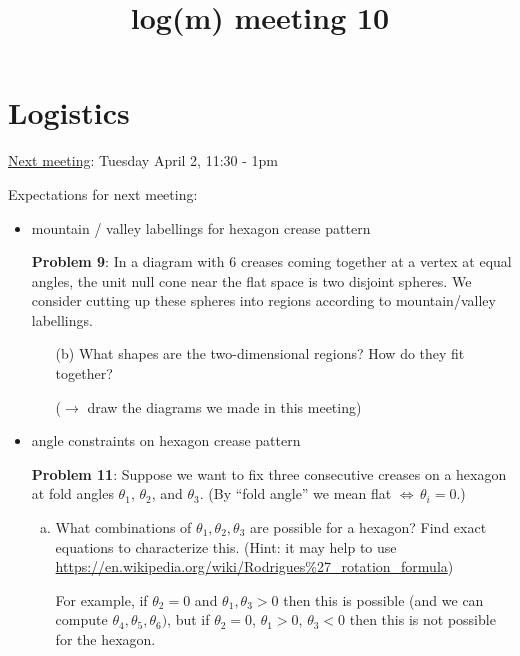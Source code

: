 \documentclass{article}
\title{log(m) meeting 10}
\theoremstyle{definition}
\begin{document}
\section{Logistics}

\ul{Next meeting}:  Tuesday April 2, 11:30 - 1pm
\medskip

    
\bigskip
{Expectations} for next meeting: 
\begin{itemize}

    
    
    \item mountain / valley labellings
    for hexagon crease pattern
    
    \textbf{Problem 9}: 
    In a diagram with $6$ creases coming together at a vertex at equal angles,
the unit null cone near the flat space is two disjoint spheres.
We consider cutting up  these spheres into regions according to mountain/valley labellings.
\begin{enumerate}[(a)]
    
    \item[(b)] What shapes are the two-dimensional regions? 
    How do they fit together? 
    
    ($\rightarrow$ draw the diagrams we made in this meeting)
\end{enumerate}
    
   
    \item angle constraints on hexagon crease pattern
    
    \textbf{Problem 11}:
    Suppose we want to fix three consecutive creases on a hexagon at fold angles
    $\theta_1$, $\theta_2$, and $\theta_3$. 
    (By ``fold angle'' we mean flat $\Leftrightarrow \, \theta_i=0$.)
    \begin{enumerate}[(a)]
    \item What combinations of $\theta_1,\theta_2,\theta_3$
    are possible for a hexagon?
    Find exact equations to characterize this. 
        (Hint: it may help to use \url{https://en.wikipedia.org/wiki/Rodrigues\%27_rotation_formula})
    
    For example, if $\theta_2 = 0$ and $\theta_1, \theta_3 > 0$ then this is possible (and we can compute $\theta_4,\theta_5,\theta_6)$,
    but if $\theta_2=0$, $\theta_1 >0$, $\theta_3<0$ 
    then this is not possible for the hexagon.
    

\end{enumerate}
\end{itemize}
\end{document}
